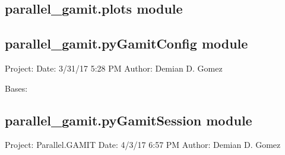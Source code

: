 \documentclass[letterpaper,10pt,english]{sphinxmanual}
\begin{document}
\subsection{parallel\_gamit.plots module}
\label{\detokenize{parallel_gamit:parallel-gamit-plots-module}}

\subsection{parallel\_gamit.pyGamitConfig module}
\label{\detokenize{parallel_gamit:module-parallel_gamit.pyGamitConfig}}\label{\detokenize{parallel_gamit:parallel-gamit-pygamitconfig-module}}
\sphinxAtStartPar
Project:
Date: 3/31/17 5:28 PM
Author: Demian D. Gomez

\begin{fulllineitems}
\label{\detokenize{parallel_gamit:parallel_gamit.pyGamitConfig.pyGamitConfigException}}
\pysigstartsignatures
{}
\pysigstopsignatures
\sphinxAtStartPar
Bases: 

\end{fulllineitems}



\subsection{parallel\_gamit.pyGamitSession module}
\label{\detokenize{parallel_gamit:module-parallel_gamit.pyGamitSession}}\label{\detokenize{parallel_gamit:parallel-gamit-pygamitsession-module}}
\sphinxAtStartPar
Project: Parallel.GAMIT
Date: 4/3/17 6:57 PM
Author: Demian D. Gomez
\end{document}
